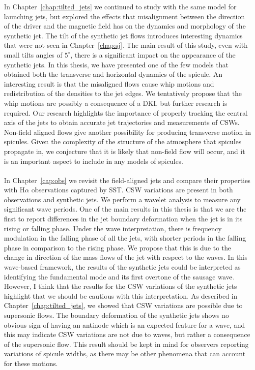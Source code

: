 \documentclass[12pt]{ociamthesis}
\newcommand{\np}{\\ \\}
\newcommand{\degs}{^{\circ}}
\begin{document}
In Chapter~\ref{chap:tilted_jets} we continued to study with the same model for launching jets, but explored the effects that misalignment between the direction of the driver and the magnetic field has on the dynamics and morphology of the synthetic jet. The tilt of the synthetic jet flows introduces interesting dynamics that were not seen in Chapter~\ref{chap:sj}. The main result of this study, even with small tilts angles of $5\degs$, there is a significant impact on the appearance of the synthetic jets. In this thesis, we have presented one of the few models that obtained both the transverse and horizontal dynamics of the spicule. An interesting result is that the misaligned flows cause whip motions and redistribution of the densities to the jet edges. We tentatively propose that the whip motions are possibly a consequence of a DKI, but further research is required. Our research highlights the importance of properly tracking the central axis of the jets to obtain accurate jet trajectories and measurements of CSWs. Non-field aligned flows give another possibility for producing transverse motion in spicules. Given the complexity of the structure of the atmosphere that spicules propagate in, we conjecture that it is likely that non-field flow will occur, and it is an important aspect to include in any models of spicules. \np
%
In Chapter~\ref{cap:obs} we revisit the field-aligned jets and compare their properties with H$\alpha$ observations captured by SST. CSW variations are present in both observations and synthetic jets. We perform a wavelet analysis to measure any significant wave periods. One of the main results in this thesis is that we are the first to report differences in the jet boundary deformation when the jet is in its rising or falling phase. Under the wave interpretation, there is frequency modulation in the falling phase of all the jets, with shorter periods in the falling phase in comparison to the rising phase. We propose that this is due to the change in direction of the mass flows of the jet with respect to the waves. In this wave-based framework, the results of the synthetic jets could be interpreted as identifying the fundamental mode and its first overtone of the sausage wave. However, I think that the results for the CSW variations of the synthetic jets highlight that we should be cautious with this interpretation. As described in Chapter~\ref{chap:tilted_jets}, we showed that CSW variations are possible due to supersonic flows. The boundary deformation of the synthetic jets shows no obvious sign of having an antinode which is an expected feature for a wave, and this may indicate CSW variations are not due to waves, but rather a consequence of the supersonic flow. This result should be kept in mind for observers reporting variations of spicule widths, as there may be other phenomena that can account for these motions. \np
\end{document}
